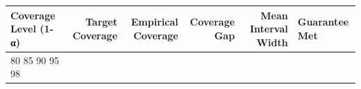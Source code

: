 \begin{tabular}{lrrrrl}
\toprule
Coverage Level (1-α) & Target Coverage & Empirical Coverage & Coverage Gap & Mean Interval Width & Guarantee Met \\
\midrule
80%
85%
90%
95%
98%
\bottomrule
\end{tabular}
